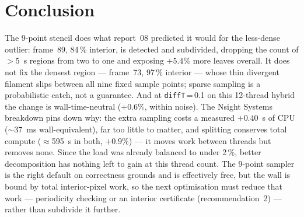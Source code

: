 \documentclass[
	english,
	letterpaper, oneside
]{article}
\begin{document}
\section{Conclusion}

The 9-point stencil does what report~08 predicted it would for the
less-dense outlier: frame~89, 84\,\% interior, is detected and
subdivided, dropping the count of $>$5~s regions from two to one and exposing
$+5.4\%$ more leaves overall. It does not fix the densest region ---
frame~73, 97\,\% interior --- whose thin divergent filament slips between all
nine fixed sample points; sparse sampling is a probabilistic catch, not a
guarantee. And at \texttt{diffT}\,=\,0.1 on this 12-thread hybrid the change is
wall-time-neutral ($+0.6\%$, within noise). The Nsight Systems breakdown
pins down why: the extra sampling costs a measured $+0.40$~s of CPU
($\sim$37~ms wall-equivalent), far too little to matter, and splitting
conserves total compute ($\approx$595~s in both, $+0.9\%$) --- it moves
work between threads but removes none. Since the load was already balanced to
under 2\,\%, better decomposition has nothing left to gain at this thread count.
The 9-point sampler is the right default on correctness grounds and is
effectively free, but the wall is bound by total interior-pixel work, so the
next optimisation must reduce that work --- periodicity checking or an
interior certificate (recommendation~2) --- rather than subdivide it further.
\end{document}
